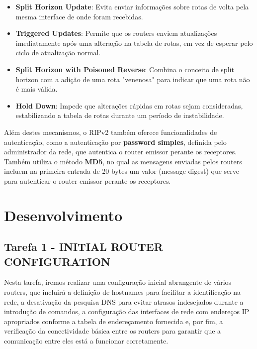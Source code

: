 \documentclass[11pt,english, openright, oneside]{book}
\begin{document}
\begin{itemize}
    \begin{itemize}
      \item \textbf{Split Horizon Update}: Evita enviar informações sobre rotas de volta pela mesma interface de onde foram recebidas.
      \item \textbf{Triggered Updates}: Permite que os routers enviem atualizações imediatamente após uma alteração na tabela de rotas, em vez de esperar pelo ciclo de atualização normal.
      \item \textbf{Split Horizon with Poisoned Reverse}: Combina o conceito de split horizon com a adição de uma rota "venenosa" para indicar que uma rota não é mais válida.
      \item \textbf{Hold Down}: Impede que alterações rápidas em rotas sejam consideradas, estabilizando a tabela de rotas durante um período de instabilidade.
      \end{itemize}
      \vspace{0.2cm}

      Além destes mecanismos, o RIPv2 também oferece funcionalidades de autenticação, como a autenticação por \textbf{password simples}, definida pelo administrador da rede, que autentica o router emissor perante os receptores. Também utiliza o método \textbf{MD5}, no qual as mensagens enviadas pelos routers incluem na primeira entrada de 20 bytes um valor (message digest) que serve para autenticar o router emissor perante os receptores.
\end{itemize}


\chapter{Desenvolvimento}

\section{Tarefa 1 - INITIAL ROUTER CONFIGURATION}
\vspace{0.2cm}

Nesta tarefa, iremos realizar uma configuração inicial abrangente de vários routers, que incluirá a definição de hostnames para facilitar a identificação na rede, a desativação da pesquisa DNS para evitar atrasos indesejados durante a introdução de comandos, a configuração das interfaces de rede com endereços IP apropriados conforme a tabela de endereçamento fornecida e, por fim, a verificação da conectividade básica entre os routers para garantir que a comunicação entre eles está a funcionar corretamente.
\end{document}
